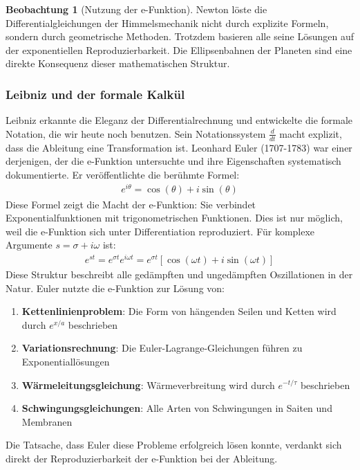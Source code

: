 \documentclass[a4paper,12pt,twoside]{report}
\theoremstyle{definition}
\newtheorem{beobachtung}{Beobachtung}
\begin{document}
\begin{beobachtung}[Nutzung der e-Funktion]
	Newton löste die Differentialgleichungen der Himmelsmechanik nicht durch explizite Formeln, sondern durch geometrische Methoden. Trotzdem basieren alle seine Lösungen auf der exponentiellen Reproduzierbarkeit. Die Ellipsenbahnen der Planeten sind eine direkte Konsequenz dieser mathematischen Struktur.
\end{beobachtung}

\subsubsection*{Leibniz und der formale Kalkül}

Leibniz erkannte die Eleganz der Differentialrechnung und entwickelte die formale Notation, die wir heute noch benutzen. Sein Notationssystem $\frac{d}{dt}$ macht explizit, dass die Ableitung eine Transformation ist. Leonhard Euler (1707-1783) war einer derjenigen, der die e-Funktion untersuchte und ihre Eigenschaften systematisch dokumentierte. Er veröffentlichte die berühmte Formel:
\begin{align}
	e^{i\theta} = \cos(\theta) + i \sin(\theta)
\end{align}
Diese Formel zeigt die Macht der e-Funktion: Sie verbindet Exponentialfunktionen mit trigonometrischen Funktionen. Dies ist nur möglich, weil die e-Funktion sich unter Differentiation reproduziert. Für komplexe Argumente $s = \sigma + i\omega$ ist:
\begin{align}
	e^{st} = e^{\sigma t} e^{i\omega t} = e^{\sigma t}[\cos(\omega t) + i\sin(\omega t)]
\end{align}
Diese Struktur beschreibt alle gedämpften und ungedämpften Oszillationen in der Natur. Euler nutzte die e-Funktion zur Lösung von:
\begin{enumerate}
	\item \textbf{Kettenlinienproblem}: Die Form von hängenden Seilen und Ketten wird durch $e^{x/a}$ beschrieben
	\item \textbf{Variationsrechnung}: Die Euler-Lagrange-Gleichungen führen zu Exponentiallösungen
	\item \textbf{Wärmeleitungsgleichung}: Wärmeverbreitung wird durch $e^{-t/\tau}$ beschrieben
	\item \textbf{Schwingungsgleichungen}: Alle Arten von Schwingungen in Saiten und Membranen
\end{enumerate}

Die Tatsache, dass Euler diese Probleme erfolgreich lösen konnte, verdankt sich direkt der Reproduzierbarkeit der e-Funktion bei der Ableitung.
\end{document}
